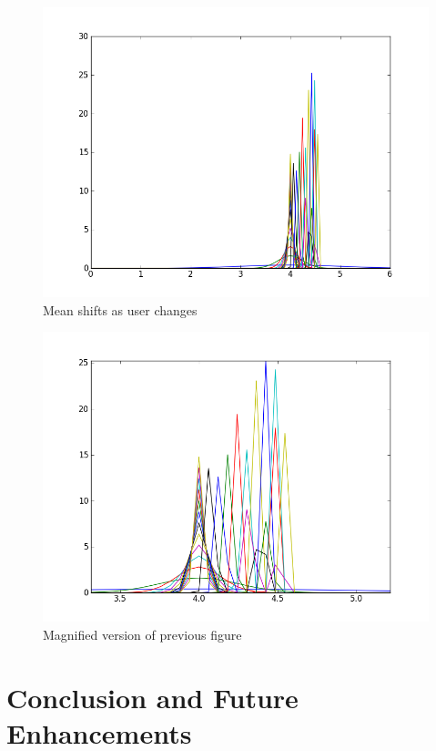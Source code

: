 \documentclass[12pt]{article}			%
\begin{document}
\begin{figure}
	\caption{Mean shifts as user changes}
	\centering
\includegraphics[scale=0.6]{img/mu_sig5.png}
\end{figure}

\begin{figure}
	\caption{Magnified version of previous figure}
	\centering
\includegraphics[scale=0.6]{img/mus_sig5.png}
\end{figure}

\newpage
\section{ Conclusion and Future Enhancements }
\end{document}
